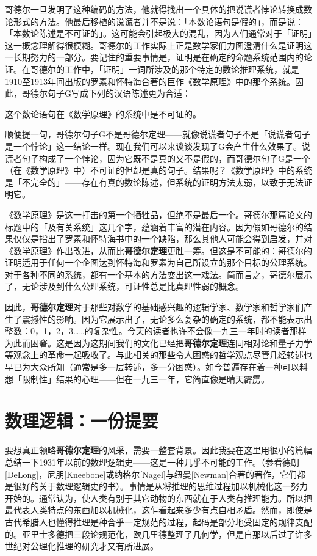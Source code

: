 \documentclass[
  12pt,
  twoside,
  openright,
  oldfontcommands,
]{memoir}
\newcommand{\heititext}[1]{{\heifamily\bfseries #1}}
\newenvironment{fsquote}{%
  \begin{mdframed}[style=gebquote]\kaitifamily\small%
}{%
  \end{mdframed}%
}
\begin{document}
哥德尔一旦发明了这种编码的方法，他就得找出一个具体的把说谎者悖论转换成数论形式的方法。他最后移植的说谎者并不是说：「本数论语句是假的」，而是说：「本数论陈述是不可证的」。这可能会引起极大的混乱，因为人们通常对于「证明」这一概念理解得很模糊。哥德尔的工作实际上正是数学家们力图澄清什么是证明这一长期努力的一部分。要记住的重要事情是，证明是在确定的命题系统范围内的论证。在哥德尔的工作中，「证明」一词所涉及的那个特定的数论推理系统，就是1910至1913年间出版的罗素和怀特海合著的巨作《数学原理》中的那个系统。因此，哥德尔句子G写成下列的汉语陈述更为合适：

\begin{fsquote}
这个数论语句在《数学原理》的系统中是不可证的。
\end{fsquote}

顺便提一句，哥德尔句子G不是哥德尔定理------就像说谎者句子不是「说谎者句子是一个悖论」这一结论一样。现在我们可以来谈谈发现了G会产生什么效果了。说谎者句子构成了一个悖论，因为它既不是真的又不是假的，而哥德尔句子G是一个（在《数学原理》中）不可证的但却是真的句子。结果呢？《数学原理》中的系统是「不完全的」------存在有真的数论陈述，但系统的证明方法太弱，以致于无法证明它。

《数学原理》是这一打击的第一个牺牲品，但绝不是最后一个。哥德尔那篇论文的标题中的「及有关系统」这几个字，蕴涵着丰富的潜在内容。因为假如哥德尔的结果仅仅是指出了罗素和怀特海书中的一个缺陷，那么其他人可能会得到启发，并对《数学原理》作出改进，从而比\heititext{哥德尔定理}更胜一筹。但这是不可能的：哥德尔的证明适用于任何一个企图达到怀特海和罗素为自己所设立的那个目标的公理系统。对于各种不同的系统，都有一个基本的方法变出这一戏法。简而言之，哥德尔展示了，无论涉及到什么公理系统，可证性总是比真理性弱的概念。

因此，\heititext{哥德尔定理}对于那些对数学的基础感兴趣的逻辑学家、数学家和哲学家们产生了震撼性的影响。因为它展示出了，无论多么复杂的确定的系统，都不能表示出整数：0，1，2，3\ldots\ldots 的复杂性。今天的读者也许不会像一九三一年时的读者那样为此而困窘。这是因为这期间我们的文化已经把\heititext{哥德尔定理}连同相对论和量子力学等观念上的革命一起吸收了。与此相关的那些令人困惑的哲学观点尽管几经转述也早已为大众所知（通常是多一层转述，多一分困惑）。如今普遍存在着一种可以料想「限制性」结果的心理------但在一九三一年，它简直像是晴天霹雳。

\section{数理逻辑：一份提要}

要想真正领略\heititext{哥德尔定理}的风采，需要一整套背景。因此我要在这里用很小的篇幅总结一下1931年以前的数理逻辑史------这是一种几乎不可能的工作。（参看德朗{[}DeLong{]}，尼朋{[}Kneebone{]}或纳格尔{[}Nagel{]}与纽曼{[}Newman{]}合著的著作，它们都是很好的关于数理逻辑史的书）。事情是从将推理的思维过程加以机械化这一努力开始的。通常认为，使人类有别于其它动物的东西就在于人类有推理能力。所以把最代表人类特点的东西加以机械化，这乍看起来多少有点自相矛盾。然而，即使是古代希腊人也懂得推理是种合乎一定规范的过程，起码是部分地受固定的规律支配的。亚里士多德把三段论规范化，欧几里德整理了几何学，但是自那以后过了许多世纪对公理化推理的研究才又有所进展。
\end{document}
